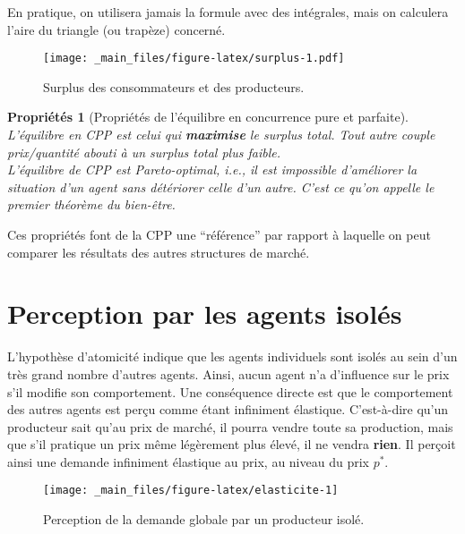 \documentclass[
]{book}
\newtheorem{proposition}{Propriétés}[chapter]
\theoremstyle{definition}
\theoremstyle{definition}
\theoremstyle{definition}
\theoremstyle{definition}
\theoremstyle{remark}
\begin{document}
En pratique, on utilisera jamais la formule avec des intégrales, mais on calculera l'aire du triangle (ou trapèze) concerné.

\begin{figure}
\centering
\texttt{[image: \_main\_files/figure-latex/surplus-1.pdf]}
\caption{\label{fig:surplus}Surplus des consommateurs et des producteurs.}
\end{figure}

\begin{proposition}[Propriétés de l'équilibre en concurrence pure et parfaite]
\protect\hypertarget{prp:cppprop}{}\label{prp:cppprop}L'équilibre en CPP est celui qui \textbf{maximise} le \emph{surplus total}.
Tout autre couple prix/quantité abouti à un surplus total plus faible.\\
L'équilibre de CPP est \emph{Pareto-optimal}, i.e., il est impossible d'améliorer la situation d'un agent sans détériorer celle d'un autre.
C'est ce qu'on appelle le \emph{premier théorème du bien-être}.
\end{proposition}

Ces propriétés font de la CPP une ``référence'' par rapport à laquelle on peut comparer les résultats des autres structures de marché.

\hypertarget{perception-par-les-agents-isoluxe9s}{%
\section{Perception par les agents isolés}\label{perception-par-les-agents-isoluxe9s}}

L'hypothèse d'atomicité indique que les agents individuels sont isolés au sein d'un très grand nombre d'autres agents.
Ainsi, aucun agent n'a d'influence sur le prix s'il modifie son comportement.
Une conséquence directe est que le comportement des autres agents est perçu comme étant infiniment élastique.
C'est-à-dire qu'un producteur sait qu'au prix de marché, il pourra vendre toute sa production, mais que s'il pratique un prix même légèrement plus élevé, il ne vendra \textbf{rien}.
Il perçoit ainsi une demande infiniment élastique au prix, au niveau du prix \(p^*\).

\begin{figure}

{\centering \texttt{[image: \_main\_files/figure-latex/elasticite-1]} 

}

\caption{Perception de la demande globale par un producteur isolé.}\label{fig:elasticite}
\end{figure}
\end{document}

